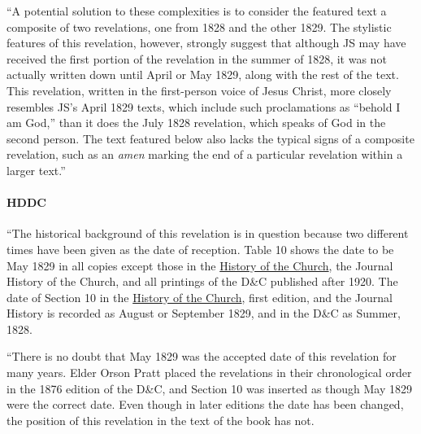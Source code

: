 			``A potential solution to these complexities is to consider the featured text a composite of two revelations, one from 1828 and the other 1829. The stylistic features of this revelation, however, strongly suggest that although JS may have received the first portion of the revelation in the summer of 1828, it was not actually written down until April or May 1829, along with the rest of the text. This revelation, written in the first-person voice of Jesus Christ, more closely resembles JS's April 1829 texts, which include such proclamations as ``behold I am God,'' than it does the July 1828 revelation, which speaks of God in the second person. The text featured below also lacks the typical signs of a composite revelation, such as an \textit{amen} marking the end of a particular revelation within a larger text.''
			
		\paragraph{HDDC}
			\label{DC10-HB-HDDC}
		
			``The historical background of this revelation is in question because two different times have been given as the date of reception. Table 10 shows the date to be May 1829 in all copies except those in the \uline{History of the Church}, the Journal History of the Church, and all printings of the D\&C published after 1920. The date of Section 10 in the \uline{History of the Church}, first edition, and the Journal History is recorded as August or September 1829, and in the D\&C as Summer, 1828.
			
			``There is no doubt that May 1829 was the accepted date of this revelation for many years. Elder Orson Pratt placed the revelations in their chronological order in the 1876 edition of the D\&C, and Section 10 was inserted as though May 1829 were the correct date. Even though in later editions the date has been changed, the position of this revelation in the text of the book has not.
			
